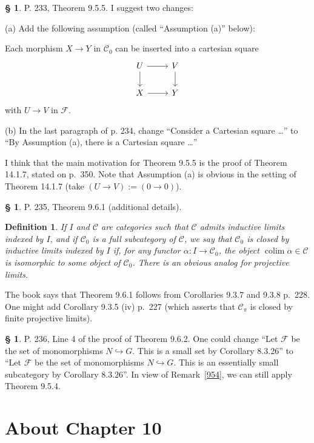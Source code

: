 \documentclass[12pt]{article}
\newtheorem{df}[thm]{Definition}%
\theoremstyle{remark}
\theoremstyle{definition}
\newtheorem{s}[thm]{\S}
\newcommand{\cc}{\mathcal}
\newcommand{\C}{\mathcal C}
\newcommand{\incl}{\hookrightarrow}
\DeclareMathOperator*{\co}{colim}
\begin{document}
%
%
\begin{s}\label{t955} 
P. 233, Theorem 9.5.5. I suggest two changes: 

\noindent(a) Add the following assumption (called ``Assumption (a)'' below): 

Each morphism $X\to Y$ in $\C_0$ can be inserted into a cartesian square
$$
\begin{tikzcd}
U\ar{r}\ar{d}&V\ar{d}\\ X\ar{r}&Y
\end{tikzcd}
$$ 
with $U\to V$ in $\cc F$. 

\noindent(b) In the last paragraph of p. 234, change ``Consider a Cartesian square \dots'' to ``By Assumption (a), there is a Cartesian square \dots'' 

I think that the main motivation for Theorem 9.5.5 is the proof of Theorem 14.1.7, stated on p.~350. Note that Assumption (a) is obvious in the setting of Theorem 14.1.7 (take $(U\to V):=(0\to0)$).
\end{s}
%
%
\begin{s} 
P. 235, Theorem 9.6.1 (additional details).
%
\begin{df}\label{cb}
If $I$ and $\C$ are categories such that $\C$ admits inductive limits indexed by $I$, and if $\C_0$ is a full subcategory of $\C$, we say that $\C_0$ is {\em closed by inductive limits indexed by} $I$ if, for any functor $\alpha:I\to\C_0$, the object $\co\alpha\in\C$ is isomorphic to some object of $\C_0$. There is an obvious analog for projective limits.
\end{df}

The book says that Theorem 9.6.1 follows from Corollaries 9.3.7 and 9.3.8 p.~228. One might add Corollary 9.3.5 (iv) p.~227 (which asserts that $\C_\pi$ is closed by finite projective limits).
\end{s}
%
%
\begin{s} 
P. 236, Line 4 of the proof of Theorem 9.6.2. One could change ``Let $\cc F$ be the set of monomorphisms $N\incl G$. This is a small set by Corollary 8.3.26'' to ``Let $\cc F$ be the set of monomorphisms $N\incl G$. This is an essentially small subcategory by Corollary 8.3.26''. In view of Remark~\ref{954}, we can still apply Theorem 9.5.4.
\end{s}
%
%
\section{About Chapter 10}
%
\end{document}
